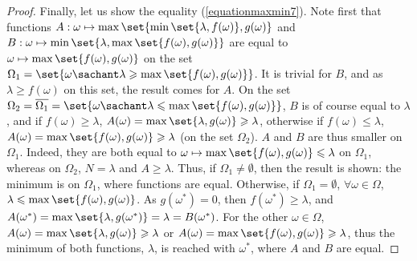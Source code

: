 \begin{proof}
Finally, let us show the equality (\ref{equationmaxmin7}).
Note first that functions $A: \omega \mapsto \max \set{ \min \set{ \lambda, f(\omega) }, g(\omega) }$ 
and $B: \omega \mapsto \min \set{ \lambda, \max \set{ f(\omega), g(\omega) } }$ are equal to
$\omega \mapsto \max \set{ f(\omega), g(\omega) }$ on the set $\Omega_1 = \set{ \omega \sachant \lambda \geqslant \max \set{ f(\omega), g(\omega) }}$.
It is trivial for $B$, and as $\lambda \geqslant f(\omega)$ on this set, the result comes for $A$.
On the set $\Omega_2 = \overline{\Omega_1} = \set{ \omega \sachant \lambda \leqslant \max \set{ f(\omega), g(\omega) } }$,
$B$ is of course equal to $\lambda$, and if $f(\omega) \geqslant \lambda$, $A(\omega) = \max \set{ \lambda, g(\omega) } \geqslant \lambda$,
otherwise if $f(\omega) \leqslant \lambda$, $A(\omega) = \max \set{ f(\omega), g(\omega) } \geqslant \lambda$ (on the set $\Omega_2$).
$A$ and $B$ are thus smaller on $\Omega_1$.
Indeed, they are both equal to $\omega \mapsto \max \set{ f(\omega), g(\omega) } \leqslant \lambda$ on $\Omega_1$,
whereas on $\Omega_2$, $N=\lambda$ and $A \geqslant \lambda$.
Thus, if $\Omega_1 \neq \emptyset$, then the result is shown: the minimum is on $\Omega_1$, where functions are equal.
Otherwise, if $\Omega_1 = \emptyset$, $\forall \omega \in \Omega$, $\lambda \leqslant \max \set{ f(\omega), g(\omega) }$.
As $g(\omega^*)=0$, then $f(\omega^*) \geqslant \lambda$, and $A(\omega^*) = \max \set{ \lambda, g(\omega^*) } = \lambda = B(\omega^*)$.
For the other $\omega \in \Omega$, $A(\omega) = \max \set{ \lambda, g(\omega) } \geqslant \lambda$
or $A(\omega) =\max \set{ f(\omega), g(\omega) } \geqslant \lambda$, thus the minimum of both functions, $\lambda$, is reached with $\omega^*$,
where $A$ and $B$ are equal.
\end{proof}









